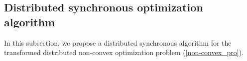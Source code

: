 \documentclass[journal]{IEEEtran}
\newtheorem{remark}{Remark}[section]
\begin{document}

\subsection{Distributed synchronous optimization algorithm}\label{pro_trans}
In this subsection, we propose a distributed synchronous algorithm for the transformed distributed non-convex optimization problem (\ref{non-convex_pro}).%
\end{document}
